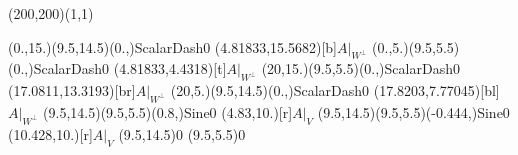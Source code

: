 \unitlength=1bp%

\begin{feynartspicture}(200,200)(1,1)

\FADiagram{}
\FAProp(0.,15.)(9.5,14.5)(0.,){ScalarDash}{0}
\FALabel(4.81833,15.5682)[b]{$A|_{W^\perp}$}
\FAProp(0.,5.)(9.5,5.5)(0.,){ScalarDash}{0}
\FALabel(4.81833,4.4318)[t]{$A|_{W^\perp}$}
\FAProp(20,15.)(9.5,5.5)(0.,){ScalarDash}{0}
\FALabel(17.0811,13.3193)[br]{$A|_{W^\perp}$}
\FAProp(20,5.)(9.5,14.5)(0.,){ScalarDash}{0}
\FALabel(17.8203,7.77045)[bl]{$A|_{W^\perp}$}
\FAProp(9.5,14.5)(9.5,5.5)(0.8,){Sine}{0}
\FALabel(4.83,10.)[r]{$A|_V$}
\FAProp(9.5,14.5)(9.5,5.5)(-0.444,){Sine}{0}
\FALabel(10.428,10.)[r]{$A|_V$}
\FAVert(9.5,14.5){0}
\FAVert(9.5,5.5){0}
\end{feynartspicture}

